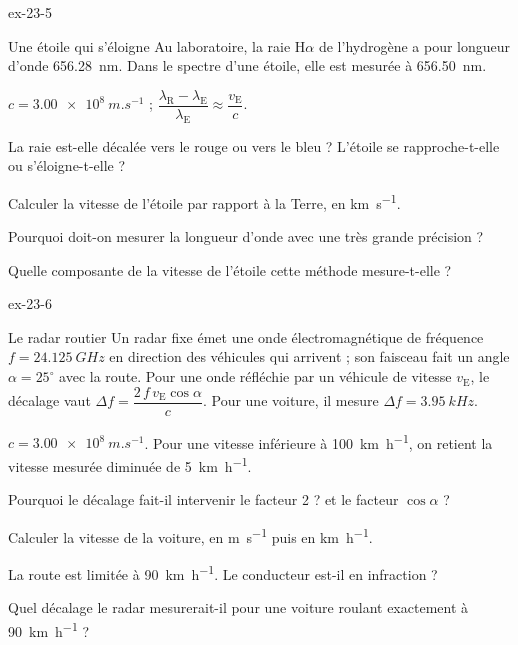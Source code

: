 \begin{blocLivre}{ex-23-5}
\begin{exercice}[1]{Une étoile qui s'éloigne}
Au laboratoire, la raie H$\alpha$ de l'hydrogène a pour longueur d'onde \qty{656,28}{nm}. Dans le spectre d'une étoile, elle est
mesurée à \qty{656,50}{nm}.
\begin{donnees}
$c=\qty{3,00e8}{m.s^{-1}}$ ; $\dfrac{\lambda_\mathrm{R}-\lambda_\mathrm{E}}{\lambda_\mathrm{E}}\approx\dfrac{v_\mathrm{E}}{c}$.
\end{donnees}
\begin{questions}
\item La raie est-elle décalée vers le rouge ou vers le bleu ? L'étoile se rapproche-t-elle ou s'éloigne-t-elle ?
\item Calculer la vitesse de l'étoile par rapport à la Terre, en \unit{km.s^{-1}}.
\item Pourquoi doit-on mesurer la longueur d'onde avec une très grande précision ?
\item Quelle composante de la vitesse de l'étoile cette méthode mesure-t-elle ?
\end{questions}
\end{exercice}
\end{blocLivre}
\begin{blocLivre}{ex-23-6}
\begin{exercice}[2]{Le radar routier}
Un radar fixe émet une onde électromagnétique de fréquence $f=\qty{24,125}{GHz}$ en direction des véhicules qui
arrivent ; son faisceau fait un angle $\alpha=25^\circ$ avec la route. Pour une onde réfléchie par un véhicule de vitesse $v_\mathrm{E}$,
le décalage vaut $\Delta f=\dfrac{2\,f\,v_\mathrm{E}\cos\alpha}{c}$. Pour une voiture, il mesure $\Delta f=\qty{3,95}{kHz}$.
\begin{donnees}
$c=\qty{3,00e8}{m.s^{-1}}$. Pour une vitesse inférieure à \qty{100}{km.h^{-1}}, on retient la vitesse mesurée diminuée de
\qty{5}{km.h^{-1}}.
\end{donnees}
\begin{questions}
\item Pourquoi le décalage fait-il intervenir le facteur 2 ? et le facteur $\cos\alpha$ ?
\item Calculer la vitesse de la voiture, en \unit{m.s^{-1}} puis en \unit{km.h^{-1}}.
\item La route est limitée à \qty{90}{km.h^{-1}}. Le conducteur est-il en infraction ?
\item Quel décalage le radar mesurerait-il pour une voiture roulant exactement à \qty{90}{km.h^{-1}} ?
\end{questions}
\end{exercice}
\end{blocLivre}
